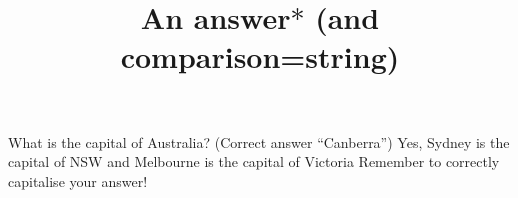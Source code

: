 \documentclass[hidesidemenu]{webquiztex}
\title{An answer$*$ (and comparison=string)}
\begin{document}
  \begin{question}     %
     What is the capital of Australia?
      (Correct answer ``Canberra'')
     \whenRight  Yes, Sydney is the capital of NSW and Melbourne is the
     capital of Victoria
     \whenWrong Remember to correctly capitalise your answer!
  \end{question}
\end{document}
